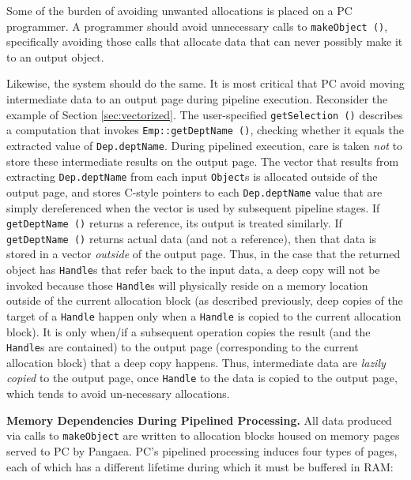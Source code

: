 Some of the burden of avoiding unwanted allocations is placed on a PC programmer. A programmer should
avoid unnecessary calls to \texttt{makeObject ()}, specifically avoiding those calls that allocate data that can never possibly make it to an output object.

Likewise, the system should do the same.  It is most critical that PC avoid moving intermediate data to an output page during pipeline execution.
Reconsider the example of Section \ref{sec:vectorized}.  The user-specified \texttt{getSelection ()} describes
a computation that invokes \texttt{Emp::getDeptName ()}, checking whether it equals the extracted value of
\texttt{Dep.deptName}.  During pipelined execution, care is taken \emph{not} to store these intermediate results
on the output page.  The vector that results from extracting \texttt{Dep.deptName} from each input 
\texttt{Object}s is allocated outside of the output page, and stores C-style pointers to each \texttt{Dep.deptName}
value that are simply dereferenced when the vector is used by subsequent pipeline stages.  
If \texttt{getDeptName ()} returns a reference, its output is treated similarly.  If 
\texttt{getDeptName ()} returns actual data (and not a reference), then that data is stored in a vector \emph{outside}
of the output page.  Thus, in the case that the returned object has \texttt{Handle}s that refer back to the input data, a deep
copy will not be invoked because those \texttt{Handle}s will physically reside on a memory location outside of the current
allocation block (as described previously, deep copies of the target of a \texttt{Handle}
happen only when a \texttt{Handle} is copied to the current allocation block).  
It is only when/if a subsequent operation copies the result (and the \texttt{Handle}s are contained)
to the output page (corresponding to the current allocation block)
that a deep copy happens.  Thus, intermediate data are \emph{lazily copied} to 
the output page, once \texttt{Handle} to the data is copied to the output page, which tends to avoid un-necessary allocations.

\vspace{5 pt}
\noindent
\textbf{Memory Dependencies During Pipelined Processing.}
All data produced via calls to \texttt{makeObject} are written to allocation blocks housed on memory pages served to PC by Pangaea.  PC's pipelined
processing induces four types of pages, each of which has a different lifetime during which it must be buffered in RAM:


